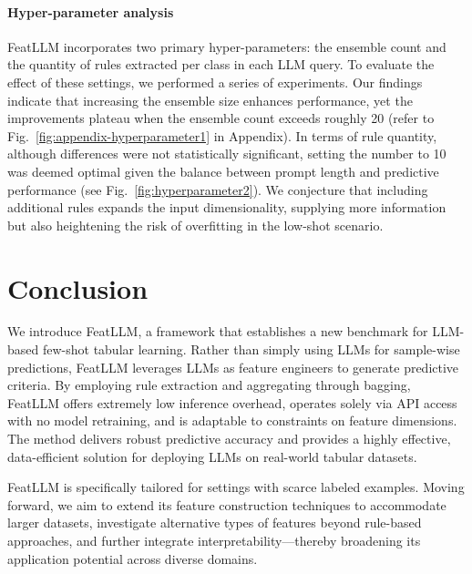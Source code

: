 \vspace*{-0.12in}
\paragraph{Hyper-parameter analysis}
\textsf{FeatLLM} incorporates two primary hyper-parameters: the ensemble count and the quantity of rules extracted per class in each LLM query. To evaluate the effect of these settings, we performed a series of experiments. Our findings indicate that increasing the ensemble size enhances performance, yet the improvements plateau when the ensemble count exceeds roughly 20 (refer to Fig.~\ref{fig:appendix-hyperparameter1} in Appendix). In terms of rule quantity, although differences were not statistically significant, setting the number to 10 was deemed optimal given the balance between prompt length and predictive performance (see Fig.~\ref{fig:hyperparameter2}). We conjecture that including additional rules expands the input dimensionality, supplying more information but also heightening the risk of overfitting in the low-shot scenario.

\section{Conclusion}
We introduce \textsf{FeatLLM}, a framework that establishes a new benchmark for LLM-based few-shot tabular learning. Rather than simply using LLMs for sample-wise predictions, \textsf{FeatLLM} leverages LLMs as feature engineers to generate predictive criteria. By employing rule extraction and aggregating through bagging, \textsf{FeatLLM} offers extremely low inference overhead, operates solely via API access with no model retraining, and is adaptable to constraints on feature dimensions. The method delivers robust predictive accuracy and provides a highly effective, data-efficient solution for deploying LLMs on real-world tabular datasets.

\textsf{FeatLLM} is specifically tailored for settings with scarce labeled examples. Moving forward, we aim to extend its feature construction techniques to accommodate larger datasets, investigate alternative types of features beyond rule-based approaches, and further integrate interpretability—thereby broadening its application potential across diverse domains.


